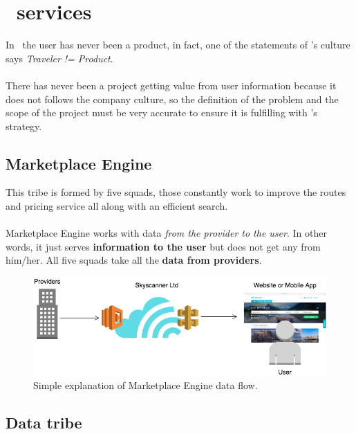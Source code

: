 
\section{\company\ services}

In \company\ the user has never been a product, in fact, one of the statements of \company's culture says \textit{Traveler != Product}\cite{the_road_ahead}.
\\\\
There has never been a project getting value from user information because it does not follows the company culture, so the definition of the problem and the scope of the project must be very accurate to ensure it is fulfilling with \company's strategy\cite{skyscanner_strategy}.

\subsection{Marketplace Engine} \label{mp_engine}

This tribe is formed by five squads, those constantly work to improve the routes and pricing service all along with an efficient search.
\\\\
Marketplace Engine works with data \textit{from the provider to the user}. In other words, it just serves \textbf{information to the user} but does not get any from him/her. All five squads take all the \textbf{data from providers}.

\begin{figure}[H]
\centering
\includegraphics[scale=0.45]{diagrams/state-of-the-art-tribes-mp.png}
\caption{Simple explanation of Marketplace Engine data flow.}
\end{figure}

\subsection{Data tribe} \label{data_tribe}

